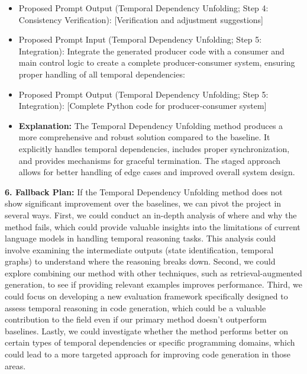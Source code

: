 \begin{tcolorbox}[colback=blue!5!white,colframe=blue!75!black,title=\textbf{Temporal Dependency Unfolding: Improving Code Generation for Complex Stateful Systems (Part 3)}]
{\begin{itemize}
\begin{itemize}
        \item Proposed Prompt Output (Temporal Dependency Unfolding; Step 4: Consistency Verification): [Verification and adjustment suggestions]
        \item Proposed Prompt Input (Temporal Dependency Unfolding; Step 5: Integration): Integrate the generated producer code with a consumer and main control logic to create a complete producer-consumer system, ensuring proper handling of all temporal dependencies:
        \item Proposed Prompt Output (Temporal Dependency Unfolding; Step 5: Integration): [Complete Python code for producer-consumer system]
        \item \textbf{Explanation:} The Temporal Dependency Unfolding method produces a more comprehensive and robust solution compared to the baseline. It explicitly handles temporal dependencies, includes proper synchronization, and provides mechanisms for graceful termination. The staged approach allows for better handling of edge cases and improved overall system design.
    \end{itemize}
\end{itemize}

\textbf{6. Fallback Plan:}  If the Temporal Dependency Unfolding method does not show significant improvement over the baselines, we can pivot the project in several ways. First, we could conduct an in-depth analysis of where and why the method fails, which could provide valuable insights into the limitations of current language models in handling temporal reasoning tasks. This analysis could involve examining the intermediate outputs (state identification, temporal graphs) to understand where the reasoning breaks down. Second, we could explore combining our method with other techniques, such as retrieval-augmented generation, to see if providing relevant examples improves performance. Third, we could focus on developing a new evaluation framework specifically designed to assess temporal reasoning in code generation, which could be a valuable contribution to the field even if our primary method doesn't outperform baselines. Lastly, we could investigate whether the method performs better on certain types of temporal dependencies or specific programming domains, which could lead to a more targeted approach for improving code generation in those areas.
}
\end{tcolorbox}

\newpage 



